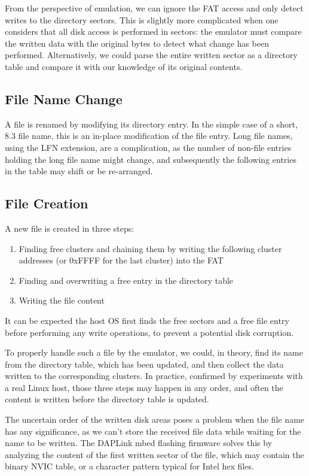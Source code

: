 From the perspective of emulation, we can ignore the \gls{FAT} access and only detect writes to the directory sectors. This is slightly more complicated when one considers that all disk access is performed in sectors: the emulator must compare the written data with the original bytes to detect what change has been performed. Alternatively, we could parse the entire written sector as a directory table and compare it with our knowledge of its original contents.

\subsection{File Name Change}

A file is renamed by modifying its directory entry. In the simple case of a short, 8.3 file name, this is an in-place modification of the file entry. Long file names, using the \gls{LFN} extension, are a complication, as the number of non-file entries holding the long file name might change, and subsequently the following entries in the table may shift or be re-arranged.

\subsection{File Creation}

A new file is created in three steps:

\begin{enumerate}
	\item Finding free clusters and chaining them by writing the following cluster addresses (or 0xFFFF for the last cluster) into the \gls{FAT}
	\item Finding and overwriting a free entry in the directory table
	\item Writing the file content
\end{enumerate}

It can be expected the host \gls{OS} first finds the free sectors and a free file entry before performing any write operations, to prevent a potential disk corruption.

To properly handle such a file by the emulator, we could, in theory, find its name from the directory table, which has been updated, and then collect the data written to the corresponding clusters. In practice, confirmed by experiments with a real Linux host, those three steps may happen in any order, and often the content is written before the directory table is updated.

The uncertain order of the written disk areas poses a problem when the file name has any significance, as we can't store the received file data while waiting for the name to be written. The DAPLink mbed flashing firmware solves this by analyzing the content of the first written sector of the file, which may contain the binary \gls{NVIC} table, or a character pattern typical for Intel hex files.

